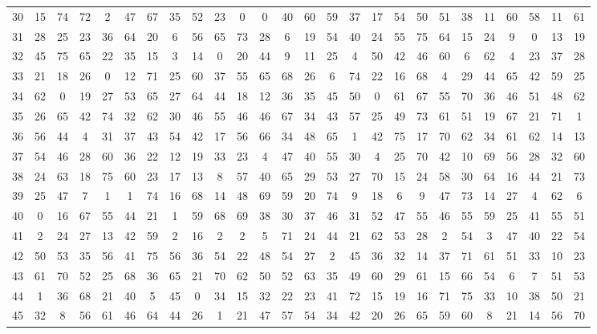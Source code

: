 \begin{table}
\begin{tabular}{c c c c c c c c c c c c c c c c c c c c c c c c c c }
30 & 15 & 74 & 72 & 2 & 47 & 67 & 35 & 52 & 23 & 0 & 0 & 40 & 60 & 59 & 37 & 17 & 54 & 50 & 51 & 38 & 11 & 60 & 58 & 11 & 61 \\
31 & 28 & 25 & 23 & 36 & 64 & 20 & 6 & 56 & 65 & 73 & 28 & 6 & 19 & 54 & 40 & 24 & 55 & 75 & 64 & 15 & 24 & 9 & 0 & 13 & 19 \\
32 & 45 & 75 & 65 & 22 & 35 & 15 & 3 & 14 & 0 & 20 & 44 & 9 & 11 & 25 & 4 & 50 & 42 & 46 & 60 & 6 & 62 & 4 & 23 & 37 & 28 \\
33 & 21 & 18 & 26 & 0 & 12 & 71 & 25 & 60 & 37 & 55 & 65 & 68 & 26 & 6 & 74 & 22 & 16 & 68 & 4 & 29 & 44 & 65 & 42 & 59 & 25 \\
34 & 62 & 0 & 19 & 27 & 53 & 65 & 27 & 64 & 44 & 18 & 12 & 36 & 35 & 45 & 50 & 0 & 61 & 67 & 55 & 70 & 36 & 46 & 51 & 48 & 62 \\
35 & 26 & 65 & 42 & 74 & 32 & 62 & 30 & 46 & 55 & 46 & 46 & 67 & 34 & 43 & 57 & 25 & 49 & 73 & 61 & 51 & 19 & 67 & 21 & 71 & 1 \\
36 & 56 & 44 & 4 & 31 & 37 & 43 & 54 & 42 & 17 & 56 & 66 & 34 & 48 & 65 & 1 & 42 & 75 & 17 & 70 & 62 & 34 & 61 & 62 & 14 & 13 \\
37 & 54 & 46 & 28 & 60 & 36 & 22 & 12 & 19 & 33 & 23 & 4 & 47 & 40 & 55 & 30 & 4 & 25 & 70 & 42 & 10 & 69 & 56 & 28 & 32 & 60 \\
38 & 24 & 63 & 18 & 75 & 60 & 23 & 17 & 13 & 8 & 57 & 40 & 65 & 29 & 53 & 27 & 70 & 15 & 24 & 58 & 30 & 64 & 16 & 44 & 21 & 73 \\
39 & 25 & 47 & 7 & 1 & 1 & 74 & 16 & 68 & 14 & 48 & 69 & 59 & 20 & 74 & 9 & 18 & 6 & 9 & 47 & 73 & 14 & 27 & 4 & 62 & 6 \\
40 & 0 & 16 & 67 & 55 & 44 & 21 & 1 & 59 & 68 & 69 & 38 & 30 & 37 & 46 & 31 & 52 & 47 & 55 & 46 & 55 & 59 & 25 & 41 & 55 & 51 \\
41 & 2 & 24 & 27 & 13 & 42 & 59 & 2 & 16 & 2 & 2 & 5 & 71 & 24 & 44 & 21 & 62 & 53 & 28 & 2 & 54 & 3 & 47 & 40 & 22 & 54 \\
42 & 50 & 53 & 35 & 56 & 41 & 75 & 56 & 36 & 54 & 22 & 48 & 54 & 27 & 2 & 45 & 36 & 32 & 14 & 37 & 71 & 61 & 51 & 33 & 10 & 23 \\
43 & 61 & 70 & 52 & 25 & 68 & 36 & 65 & 21 & 70 & 62 & 50 & 52 & 63 & 35 & 49 & 60 & 29 & 61 & 15 & 66 & 54 & 6 & 7 & 51 & 53 \\
44 & 1 & 36 & 68 & 21 & 40 & 5 & 45 & 0 & 34 & 15 & 32 & 22 & 23 & 41 & 72 & 15 & 19 & 16 & 71 & 75 & 33 & 10 & 38 & 50 & 21 \\
45 & 32 & 8 & 56 & 61 & 46 & 64 & 44 & 26 & 1 & 21 & 47 & 57 & 54 & 34 & 42 & 20 & 26 & 65 & 59 & 60 & 8 & 21 & 14 & 56 & 70 \\

\end{tabular}
\end{table}
